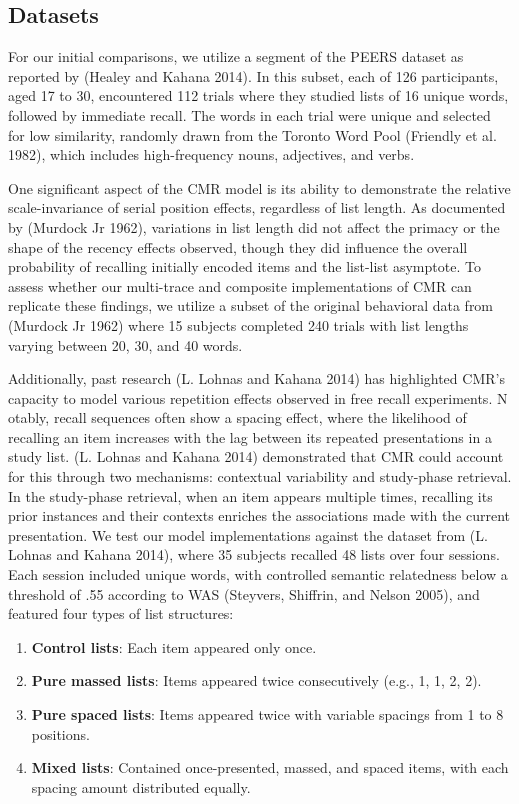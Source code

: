 \documentclass[
  letterpaper,
  11pt,
  english,
  singlespacing,
  headsepline]{MastersDoctoralThesis}
\providecommand{\tightlist}{%
  \setlength{\itemsep}{0pt}\setlength{\parskip}{0pt}}\usepackage{longtable,booktabs,array}
\begin{document}
\subsection{Datasets}\label{datasets}

For our initial comparisons, we utilize a segment of the PEERS dataset
as reported by (Healey and Kahana 2014). In this subset, each of 126
participants, aged 17 to 30, encountered 112 trials where they studied
lists of 16 unique words, followed by immediate recall. The words in
each trial were unique and selected for low similarity, randomly drawn
from the Toronto Word Pool (Friendly et al. 1982), which includes
high-frequency nouns, adjectives, and verbs.

One significant aspect of the CMR model is its ability to demonstrate
the relative scale-invariance of serial position effects, regardless of
list length. As documented by (Murdock Jr 1962), variations in list
length did not affect the primacy or the shape of the recency effects
observed, though they did influence the overall probability of recalling
initially encoded items and the list-list asymptote. To assess whether
our multi-trace and composite implementations of CMR can replicate these
findings, we utilize a subset of the original behavioral data from
(Murdock Jr 1962) where 15 subjects completed 240 trials with list
lengths varying between 20, 30, and 40 words.

Additionally, past research (L. Lohnas and Kahana 2014) has highlighted
CMR's capacity to model various repetition effects observed in free
recall experiments. N otably, recall sequences often show a spacing
effect, where the likelihood of recalling an item increases with the lag
between its repeated presentations in a study list. (L. Lohnas and
Kahana 2014) demonstrated that CMR could account for this through two
mechanisms: contextual variability and study-phase retrieval. In the
study-phase retrieval, when an item appears multiple times, recalling
its prior instances and their contexts enriches the associations made
with the current presentation. We test our model implementations against
the dataset from (L. Lohnas and Kahana 2014), where 35 subjects recalled
48 lists over four sessions. Each session included unique words, with
controlled semantic relatedness below a threshold of .55 according to
WAS (Steyvers, Shiffrin, and Nelson 2005), and featured four types of
list structures:

\begin{enumerate}
\def\labelenumi{\arabic{enumi}.}
\tightlist
\item
  \textbf{Control lists}: Each item appeared only once.
\item
  \textbf{Pure massed lists}: Items appeared twice consecutively (e.g.,
  1, 1, 2, 2).
\item
  \textbf{Pure spaced lists}: Items appeared twice with variable
  spacings from 1 to 8 positions.
\item
  \textbf{Mixed lists}: Contained once-presented, massed, and spaced
  items, with each spacing amount distributed equally.
\end{enumerate}
\end{document}
